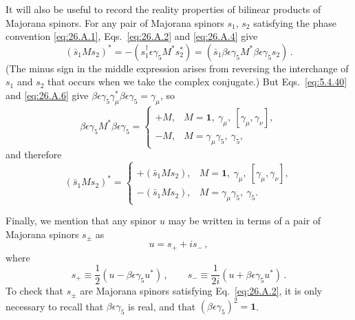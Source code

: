 It will also be useful to record the reality properties of bilinear products
of Majorana spinors. For any pair of Majorana spinors $s_1$, $s_2$ satisfying
the phase convention \eqref{eq:26.A.1}, Eqs.~\eqref{eq:26.A.2} and
\eqref{eq:26.A.4} give
\[
  (\bar{s}_1Ms_2)^*
  =-(s_1^\dagger\epsilon\gamma_5M^*s_2^*)
  =(\bar{s}_1\beta\epsilon\gamma_5M^*
     \beta\epsilon\gamma_5s_2)\,.
\]
(The minus sign in the middle expression arises from reversing the
interchange of $s_1$ and $s_2$ that occurs when we take the complex
conjugate.) But Eqs.~\eqref{eq:5.4.40} and \eqref{eq:26.A.6} give
$\beta\epsilon\gamma_5\gamma_\mu^*\beta\epsilon\gamma_5=\gamma_\mu$, so
\begin{equation}
  \beta\epsilon\gamma_5M^*\beta\epsilon\gamma_5
  =
  \begin{cases}
    +M,&M=\mathbf{1},\ \gamma_\mu,\ [\gamma_\mu,\gamma_\nu],\\
    -M,&M=\gamma_\mu\gamma_5,\ \gamma_5,
  \end{cases}
  \tag{26.A.20}\label{eq:26.A.20}
\end{equation}
and therefore
\begin{equation}
  (\bar{s}_1Ms_2)^*
  =
  \begin{cases}
    +(\bar{s}_1Ms_2),
      &M=\mathbf{1},\ \gamma_\mu,\ [\gamma_\mu,\gamma_\nu],\\
    -(\bar{s}_1Ms_2),
      &M=\gamma_\mu\gamma_5,\ \gamma_5.
  \end{cases}
  \tag{26.A.21}\label{eq:26.A.21}
\end{equation}

Finally, we mention that any spinor $u$ may be written in terms of a pair of
Majorana spinors $s_\pm$ as
\begin{equation}
  u=s_++is_-\,,
  \tag{26.A.22}\label{eq:26.A.22}
\end{equation}
where
\begin{equation}
  s_+\equiv\frac12(u-\beta\epsilon\gamma_5u^*)\,,
  \qquad
  s_-\equiv\frac1{2i}(u+\beta\epsilon\gamma_5u^*)\,.
  \tag{26.A.23}\label{eq:26.A.23}
\end{equation}
To check that $s_\pm$ are Majorana spinors satisfying
Eq.~\eqref{eq:26.A.2}, it is only necessary to recall that
$\beta\epsilon\gamma_5$ is real, and that
$(\beta\epsilon\gamma_5)^2=\mathbf{1}$.
